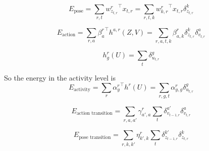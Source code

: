 \begin{equation}
E_{\text{pose}} = \sum_{r,t} {w^r_{z_{t,r}}}^\top x_{t,r} = \sum_{r,t,k} {w^r_{k,r}}^\top x_{t,r} \delta_{z_{t,r}}^k
\end{equation}

\begin{equation}
E_{\text{action}} = \sum_{r,a} {\beta^r_{a}}^\top h^{a,r}(Z, V) = \sum_{r,a,t,k} \beta^r_{a,k} \delta_{z_{t,r}}^k \delta_{v_{t,r}}^a
\end{equation}

\begin{equation}
h_g^{r}(U) = \sum_{t} \delta_{u_{t,r}}^g
\end{equation}

So the energy in the activity level is
\begin{equation}
E_{\text{activity}} = \sum_{r} {\alpha^r_{y}}^\top h^{r}(U) = \sum_{r,g,t}  \alpha^r_{y,g} \delta_{u_{t,r}}^g
\end{equation}

\begin{equation}
E_{\text{action transition}} = \sum_{r,a,a'}  \gamma^r_{a',a} \sum_{t} \delta_{v_{t-1,r}}^{a'}\delta_{v_{t,r}}^a 
\end{equation}

\begin{equation}
E_{\text{pose transition}} =\sum_{r,k,k'}  \eta^r_{k',k}\sum_{t}\delta_{z_{t-1,r}}^{k'}\delta_{z_{t,r}}^{k}
\end{equation}




